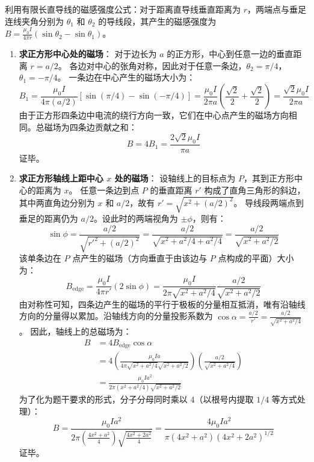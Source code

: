 \begin{solution}
利用有限长直导线的磁感强度公式：对于距离直导线垂直距离为 $r$，两端点与垂足连线夹角分别为 $\theta_1$ 和 $\theta_2$ 的导线段，其产生的磁感强度为 $B = \frac{\mu_0 I}{4\pi r}(\sin\theta_2 - \sin\theta_1)$。

\begin{enumerate}
    \item[(a)] \textbf{求正方形中心处的磁场}：
    对于边长为 $a$ 的正方形，中心到任意一边的垂直距离 $r = a/2$。
    各边对中心的张角对称，因此对于任意一条边，$\theta_2 = \pi/4$，$\theta_1 = -\pi/4$。
    一条边在中心产生的磁场大小为：
    $$ B_1 = \frac{\mu_0 I}{4\pi (a/2)} \left[ \sin(\pi/4) - \sin(-\pi/4) \right] = \frac{\mu_0 I}{2\pi a} \left( \frac{\sqrt{2}}{2} + \frac{\sqrt{2}}{2} \right) = \frac{\sqrt{2}\mu_0 I}{2\pi a} $$
    由于正方形四条边中电流的绕行方向一致，它们在中心点产生的磁场方向相同。总磁场为四条边贡献之和：
    $$ B = 4 B_1 = \frac{2\sqrt{2}\mu_0 I}{\pi a} $$
    证毕。

    \item[(b)] \textbf{求正方形轴线上距中心 $x$ 处的磁场}：
    设轴线上的目标点为 $P$，其到正方形中心的距离为 $x$。
    任意一条边到点 $P$ 的垂直距离 $r'$ 构成了直角三角形的斜边，其中两直角边分别为 $x$ 和 $a/2$，故有 $r' = \sqrt{x^2 + (a/2)^2}$。
    导线段两端点到垂足的距离仍为 $a/2$。设此时的两端视角为 $\pm\phi$，则有：
    $$ \sin\phi = \frac{a/2}{\sqrt{r'^2 + (a/2)^2}} = \frac{a/2}{\sqrt{x^2 + a^2/4 + a^2/4}} = \frac{a/2}{\sqrt{x^2 + a^2/2}} $$
    该单条边在 $P$ 点产生的磁场（方向垂直于由该边与 $P$ 点构成的平面）大小为：
    $$ B_{\text{edge}} = \frac{\mu_0 I}{4\pi r'} (2\sin\phi) = \frac{\mu_0 I}{2\pi \sqrt{x^2 + a^2/4}} \frac{a/2}{\sqrt{x^2 + a^2/2}} $$
    由对称性可知，四条边产生的磁场的平行于极板的分量相互抵消，唯有沿轴线方向的分量得以累加。沿轴线方向的分量投影系数为 $\cos\alpha = \frac{a/2}{r'} = \frac{a/2}{\sqrt{x^2 + a^2/4}}$。
    因此，轴线上的总磁场为：
    \begin{align*}
        B &= 4 B_{\text{edge}} \cos\alpha \\
          &= 4 \left( \frac{\mu_0 I a}{4\pi \sqrt{x^2 + a^2/4}\sqrt{x^2 + a^2/2}} \right) \left( \frac{a/2}{\sqrt{x^2 + a^2/4}} \right) \\
          &= \frac{\mu_0 I a^2}{2\pi (x^2 + a^2/4) \sqrt{x^2 + a^2/2}}
    \end{align*}
    为了化为题干要求的形式，分子分母同时乘以 4（以根号内提取 $1/4$ 等方式处理）：
    $$ B = \frac{\mu_0 I a^2}{2\pi \left( \frac{4x^2 + a^2}{4} \right) \sqrt{ \frac{4x^2 + 2a^2}{4} }} = \frac{4\mu_0 I a^2}{\pi (4x^2 + a^2) (4x^2 + 2a^2)^{1/2}} $$
    证毕。
\end{enumerate}
\end{solution}

